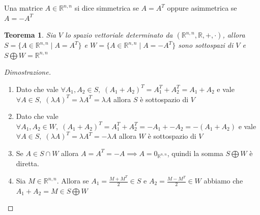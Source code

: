 \documentclass{article}
\newtheorem{theorem}{Teorema}
\begin{document}
    Una matrice $A \in \mathbb{R}^{n, n}$ si dice simmetrica se $A = A^{T}$ oppure asimmetrica se $A = -A^{T}$

    \vspace{10pt}
    \begin{theorem}
        Sia $V$ lo spazio vettoriale determinato da $(\mathbb{R}^{n, n}, \mathbb{R}, +, \cdot)$, allora $S = \{A \in \mathbb{R}^{n, n} \; | \; A = A^{T}\}$ e $W = \{A \in \mathbb{R}^{n, n} \; | \; A = -A^{T}\}$ sono 
        sottospazi di $V$ e $S \bigoplus W = \mathbb{R}^{n, n}$ 
    \end{theorem}
    \begin{proof}[Dimostrazione]
        \begin{enumerate}[label=(\arabic*)]
            \item Dato che vale $\forall A_1, A_2 \in S, \; (A_1 + A_2)^{T} = A_1^T + A_2^T = A_1 + A_2$ e vale $\forall A \in S, \; (\lambda A)^T = \lambda A^T = \lambda A$ allora $S$ è sottospazio di $V$
            \item Dato che vale $\forall A_1, A_2 \in W, \; (A_1 + A_2)^{T} = A_1^T + A_2^T = -A_1 + -A_2 = -(A_1 + A_2)$ e vale $\forall A \in S, \; (\lambda A)^T = \lambda A^T = - \lambda A$ allora $W$ è sottospazio di $V$
            \item Se $A \in S \cap W$ allora $A = A^T = -A \implies A = 0_{\mathbb{R}^{n, n}}$, quindi la somma $S \bigoplus W$ è diretta.
            \item Sia $M \in \mathbb{R}^{n, n}$. Allora se $A_1 = \frac{M + M^{T}}{2} \in S$ e $A_2 = \frac{M - M^{T}}{2} \in W$ abbiamo che $A_1 + A_2 = M \in S \bigoplus W$
        \end{enumerate}
    \end{proof}
\end{document}
